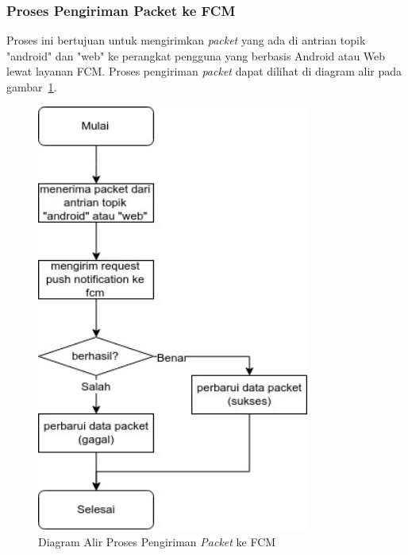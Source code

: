 \subsubsection{Proses Pengiriman Packet ke FCM}
\par Proses ini bertujuan untuk mengirimkan \textit{packet} yang ada di antrian topik "android" dan "web" ke perangkat pengguna yang berbasis Android atau Web lewat layanan FCM. Proses pengiriman \textit{packet} dapat dilihat di diagram alir pada gambar~\ref{flowchart_pengiriman_packet_ke_fcm}.
\begin{figure}[H]
    \centering\includegraphics[width=0.8\textwidth]{bab3/figures/flowchart_pengiriman_packet_ke_fcm.jpg}
    \caption{Diagram Alir Proses Pengiriman \textit{Packet} ke FCM}
    \label{flowchart_pengiriman_packet_ke_fcm}
\end{figure}
